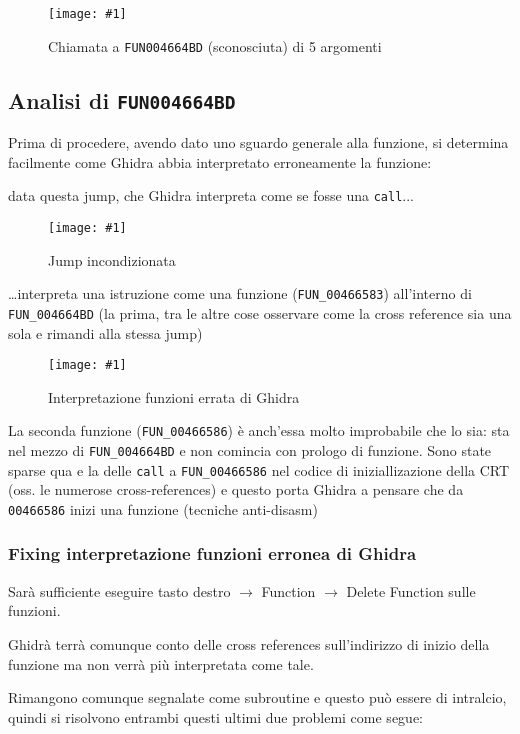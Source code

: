 \documentclass[
    a4paper, %
    11pt %
]{article}
\newcommand{\pic}[4]{\begin{figure}[H]
            \centering
            \texttt{[image: \#1]}
            \caption{#2}
            \label{fig:#1}
            \end{figure}}
\begin{document}
            \pic{see_nextunkcall}{Chiamata a \texttt{FUN\textunderscore 004664BD} (sconosciuta) di 5 argomenti}
            {13cm}{10cm}

            \pagebreak
            
            \subsection{Analisi di \texttt{FUN\textunderscore 004664BD}}

            Prima di procedere, avendo dato uno sguardo generale alla funzione, si determina facilmente come
            Ghidra abbia interpretato erroneamente la funzione:

            data questa jump, che Ghidra interpreta come se fosse una \texttt{call}...
            \pic{unk_dec_jmp}{Jump incondizionata}{10cm}{5cm}

            \dots interpreta una istruzione come una funzione (\texttt{FUN\_00466583}) all'interno di \texttt{FUN\_004664BD} (la prima, tra le altre cose osservare come la cross
            reference sia una sola e rimandi alla stessa jump)
            \pic{unk_fn_interp}{Interpretazione funzioni errata di Ghidra}{19.5cm}{10cm}

            La seconda funzione (\texttt{FUN\_00466586}) è anch'essa molto improbabile che lo sia: sta nel
            mezzo di \texttt{FUN\_004664BD} e non comincia con prologo di funzione. Sono state sparse qua e la delle
            \texttt{call} a \texttt{FUN\_00466586} nel codice di iniziallizazione della CRT (oss. le numerose cross-references) e questo porta Ghidra a 
            pensare che da \texttt{00466586} inizi una funzione (tecniche anti-disasm)

            \pagebreak
            
            \subsubsection{Fixing interpretazione funzioni erronea di Ghidra}
            
            Sarà sufficiente eseguire tasto destro $\rightarrow$ Function $\rightarrow$ Delete Function 
            sulle funzioni. 
            
            Ghidrà terrà comunque
            conto delle cross references sull'indirizzo di inizio della funzione ma non verrà più 
            interpretata come tale.
            
            Rimangono comunque segnalate come subroutine e questo può essere di intralcio, quindi si risolvono entrambi questi ultimi due problemi come segue:
\end{document}
